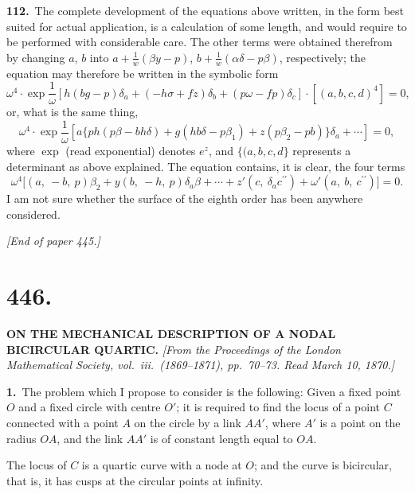 \documentclass[11pt,a4paper]{article}
\begin{document}
\noindent\textbf{112.}\ The complete development of the equations above written, in the form best suited for actual application, is a calculation of some length, and would require to be performed with considerable care. The other terms were obtained therefrom by changing $a$, $b$ into $a + \frac{1}{w}(\beta y - p)$, $b + \frac{1}{w}(\alpha\delta - p\beta)$, respectively; the equation may therefore be written in the symbolic form
\[
\omega^4 \cdot \exp\frac{1}{\omega}\left[h(bg - p)\delta_a + (- h\sigma + fz)\delta_b + (p\omega - fp)\delta_c\right] \cdot [(a, b, c, d)^4] = 0,
\]
or, what is the same thing,
\[
\omega^4 \cdot \exp\frac{1}{\omega}\left[a\big\{ph(p\beta - bh\delta) + g(hb\delta - p\beta_1) + z(p\beta_2 - pb)\big\}\delta_a + \cdots\right] = 0,
\]
where $\exp$ (read exponential) denotes $e^z$, and $\{(a, b, c, d\}$ represents a determinant as above explained. The equation contains, it is clear, the four terms
\[
\omega^4\big[(a,\ -b,\ p)\beta_2 + y(b,\ -h,\ p)\delta_a\beta + \cdots + z'(c,\ \delta_a c^{\prime\prime}) + \omega'(a,\ b,\ c^{\prime\prime})\big] = 0.
\]
I am not sure whether the surface of the eighth order has been anywhere considered.

\medskip

\noindent\textit{[End of paper 445.]}

\section*{446.}
\begin{center}
\Large\textbf{ON THE MECHANICAL DESCRIPTION OF A NODAL BICIRCULAR QUARTIC.}
\medskip
\small\textit{[From the Proceedings of the London Mathematical Society, vol.\ iii.\ (1869--1871), pp.\ 70--73. Read March 10, 1870.]}
\end{center}

\textbf{1.}\ The problem which I propose to consider is the following: Given a fixed point $O$ and a fixed circle with centre $O'$; it is required to find the locus of a point $C$ connected with a point $A$ on the circle by a link $AA'$, where $A'$ is a point on the radius $OA$, and the link $AA'$ is of constant length equal to $OA$.

The locus of $C$ is a quartic curve with a node at $O$; and the curve is bicircular, that is, it has cusps at the circular points at infinity.
\end{document}
